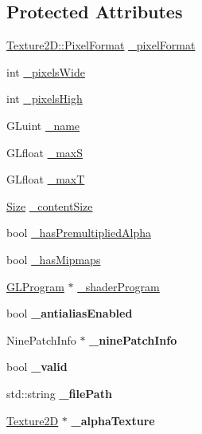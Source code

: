 \subsection*{Protected Attributes}
\begin{DoxyCompactItemize}
\item 
\hyperlink{classTexture2D_a45d9d8bb5a0669def36bbdfbfb91d220}{Texture2\+D\+::\+Pixel\+Format} \hyperlink{classTexture2D_a441a4aac7b87627925bc0f7118b19197}{\+\_\+pixel\+Format}
\item 
int \hyperlink{classTexture2D_aafe73e21b23f281bf37f8747681bd597}{\+\_\+pixels\+Wide}
\item 
int \hyperlink{classTexture2D_a956e691335f81bbba88519433f3dd32a}{\+\_\+pixels\+High}
\item 
G\+Luint \hyperlink{classTexture2D_afd329b5789c733a418d8b947af606439}{\+\_\+name}
\item 
G\+Lfloat \hyperlink{classTexture2D_a02773ea122d74c18db5964be9cafb911}{\+\_\+maxS}
\item 
G\+Lfloat \hyperlink{classTexture2D_a78c00a0c3ebf812a37ba3539b71aa0fd}{\+\_\+maxT}
\item 
\hyperlink{classSize}{Size} \hyperlink{classTexture2D_a4cd0c2d737eea24037dec491e4a7a5ce}{\+\_\+content\+Size}
\item 
bool \hyperlink{classTexture2D_a31a436824796fa6eba3ae5db84142ef3}{\+\_\+has\+Premultiplied\+Alpha}
\item 
bool \hyperlink{classTexture2D_a6c6efa029970d1ab412ed24a9dc1a5f1}{\+\_\+has\+Mipmaps}
\item 
\hyperlink{classGLProgram}{G\+L\+Program} $\ast$ \hyperlink{classTexture2D_a446077c65f0e78f1f6cd91058cf8634a}{\+\_\+shader\+Program}
\item 
\mbox{\label{classTexture2D_a8a8cbac9047e6063a3c5d420af54f844}} 
bool {\bfseries \+\_\+antialias\+Enabled}
\item 
\mbox{\label{classTexture2D_a4ee5aca21bff703c7d6928b3c136e832}} 
Nine\+Patch\+Info $\ast$ {\bfseries \+\_\+nine\+Patch\+Info}
\item 
\mbox{\label{classTexture2D_a31aae8a750a2be61788ec1ae85410436}} 
bool {\bfseries \+\_\+valid}
\item 
\mbox{\label{classTexture2D_a3e02b30715205645fbc33fb4df75d01a}} 
std\+::string {\bfseries \+\_\+file\+Path}
\item 
\mbox{\label{classTexture2D_a7088672aff3fd9a7d4c4236d86547239}} 
\hyperlink{classTexture2D}{Texture2D} $\ast$ {\bfseries \+\_\+alpha\+Texture}
\end{DoxyCompactItemize}
